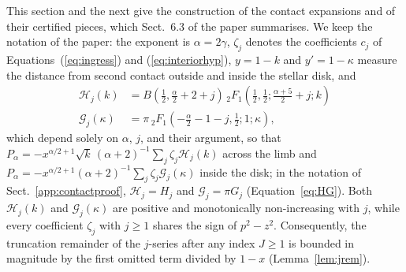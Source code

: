 \documentclass[11pt]{article}
\begin{document}
This section and the next give the construction of the contact expansions and of their certified pieces, which Sect.~6.3 of the paper summarises. We keep the notation of the paper: the exponent is $\alpha=2\gamma$, $\zeta_j$ denotes the coefficients $c_j$ of Equations~(\ref{eq:ingress}) and (\ref{eq:interiorhyp}), $y=1-k$ and $y'=1-\kappa$ measure the distance from second contact outside and inside the stellar disk, and
\begin{equation}\label{eq:HGfunctions}
    \begin{aligned}
        \mathcal H_j(k)&=B(\tfrac12,\tfrac{\alpha}{2}+2+j)\,{}_2F_1(\tfrac12,\tfrac12;\tfrac{\alpha+5}{2}+j;k)\\
        \mathcal G_j(\kappa)&=\pi\,{}_2F_1(-\tfrac{\alpha}{2}-1-j,\tfrac12;1;\kappa),
    \end{aligned}
\end{equation}
which depend solely on $\alpha$, $j$, and their argument, so that $P_\alpha=-x^{\alpha/2+1}\sqrt{k}\,(\alpha+2)^{-1}\sum_j\zeta_j\mathcal H_j(k)$ across the limb and $P_\alpha=-x^{\alpha/2+1}(\alpha+2)^{-1}\sum_j\zeta_j\mathcal G_j(\kappa)$ inside the disk; in the notation of Sect.~\ref{app:contactproof}, $\mathcal H_j=H_j$ and $\mathcal G_j=\pi G_j$ (Equation~\ref{eq:HG}). Both $\mathcal H_j(k)$ and $\mathcal G_j(\kappa)$ are positive and monotonically non-increasing with $j$, while every coefficient $\zeta_j$ with $j\ge 1$ shares the sign of $p^2-z^2$. Consequently, the truncation remainder of the $j$-series after any index $J\ge1$ is bounded in magnitude by the first omitted term divided by $1-x$ (Lemma~\ref{lem:jrem}).
\end{document}
